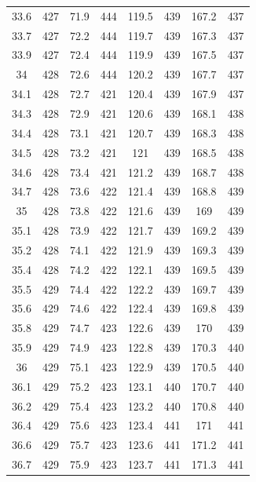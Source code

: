 \documentclass[12pt]{ctexart}
\numberwithin{equation}{section}
\begin{document}
\begin{longtable}{cc|cc|cc|cc}
33.6  &  427  &  71.9  &  444  &  119.5  &  439  &  167.2  &  437  \\
33.7  &  427  &  72.2  &  444  &  119.7  &  439  &  167.3  &  437  \\
33.9  &  427  &  72.4  &  444  &  119.9  &  439  &  167.5  &  437  \\
34  &  428  &  72.6  &  444  &  120.2  &  439  &  167.7  &  437  \\
34.1  &  428  &  72.7  &  421  &  120.4  &  439  &  167.9  &  437  \\
34.3  &  428  &  72.9  &  421  &  120.6  &  439  &  168.1  &  438  \\
34.4  &  428  &  73.1  &  421  &  120.7  &  439  &  168.3  &  438  \\
34.5  &  428  &  73.2  &  421  &  121  &  439  &  168.5  &  438  \\
34.6  &  428  &  73.4  &  421  &  121.2  &  439  &  168.7  &  438  \\
34.7  &  428  &  73.6  &  422  &  121.4  &  439  &  168.8  &  439  \\
35  &  428  &  73.8  &  422  &  121.6  &  439  &  169  &  439  \\
35.1  &  428  &  73.9  &  422  &  121.7  &  439  &  169.2  &  439  \\
35.2  &  428  &  74.1  &  422  &  121.9  &  439  &  169.3  &  439  \\
35.4  &  428  &  74.2  &  422  &  122.1  &  439  &  169.5  &  439  \\
35.5  &  429  &  74.4  &  422  &  122.2  &  439  &  169.7  &  439  \\
35.6  &  429  &  74.6  &  422  &  122.4  &  439  &  169.8  &  439  \\
35.8  &  429  &  74.7  &  423  &  122.6  &  439  &  170  &  439  \\
35.9  &  429  &  74.9  &  423  &  122.8  &  439  &  170.3  &  440  \\
36  &  429  &  75.1  &  423  &  122.9  &  439  &  170.5  &  440  \\
36.1  &  429  &  75.2  &  423  &  123.1  &  440  &  170.7  &  440  \\
36.2  &  429  &  75.4  &  423  &  123.2  &  440  &  170.8  &  440  \\
36.4  &  429  &  75.6  &  423  &  123.4  &  441  &  171  &  441  \\
36.6  &  429  &  75.7  &  423  &  123.6  &  441  &  171.2  &  441  \\
36.7  &  429  &  75.9  &  423  &  123.7  &  441  &  171.3  &  441  \\

\end{longtable}
\end{document}
